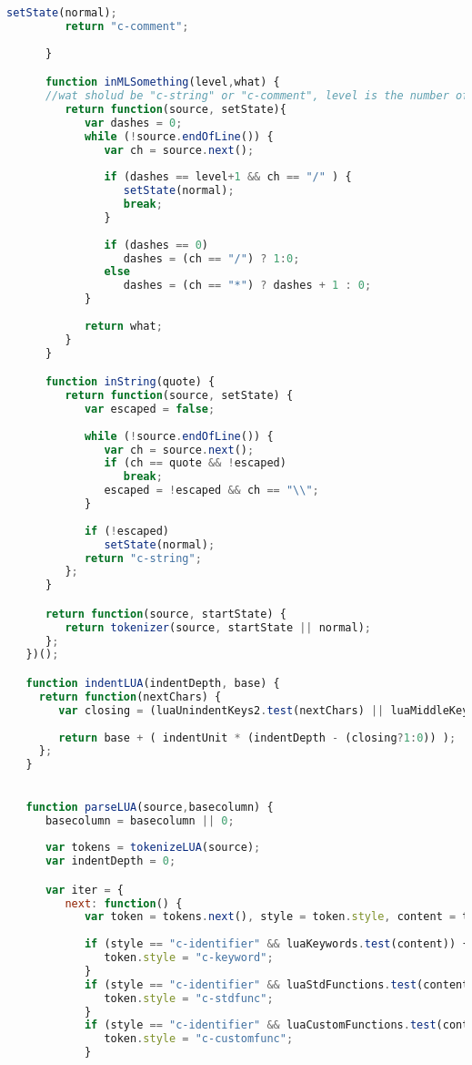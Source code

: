 \begin{lstlisting}[language=Javascript]
         setState(normal);          
         return "c-comment";
  
      }

      function inMLSomething(level,what) {
      //wat sholud be "c-string" or "c-comment", level is the number of "=" in opening mark.
         return function(source, setState){
            var dashes = 0;
            while (!source.endOfLine()) {
               var ch = source.next();
        
               if (dashes == level+1 && ch == "/" ) {
                  setState(normal);
                  break;
               }
    
               if (dashes == 0)
                  dashes = (ch == "/") ? 1:0;
               else
                  dashes = (ch == "*") ? dashes + 1 : 0;
            }
            
            return what;
         }
      }

      function inString(quote) {
         return function(source, setState) {
            var escaped = false;
            
            while (!source.endOfLine()) {               
               var ch = source.next();
               if (ch == quote && !escaped)
                  break;
               escaped = !escaped && ch == "\\";
            }
        
            if (!escaped)
               setState(normal);
            return "c-string";
         };
      }

      return function(source, startState) {
         return tokenizer(source, startState || normal);
      };
   })();

   function indentLUA(indentDepth, base) {
     return function(nextChars) {
        var closing = (luaUnindentKeys2.test(nextChars) || luaMiddleKeys.test(nextChars));
          
        return base + ( indentUnit * (indentDepth - (closing?1:0)) );
     };
   }

  
   function parseLUA(source,basecolumn) {
      basecolumn = basecolumn || 0;
    
      var tokens = tokenizeLUA(source);
      var indentDepth = 0;

      var iter = {
         next: function() {
            var token = tokens.next(), style = token.style, content = token.content;
  
            if (style == "c-identifier" && luaKeywords.test(content)) {
               token.style = "c-keyword";
            }  
            if (style == "c-identifier" && luaStdFunctions.test(content)){
               token.style = "c-stdfunc";
            }
            if (style == "c-identifier" && luaCustomFunctions.test(content)){
               token.style = "c-customfunc";
            }
            

\end{lstlisting}
